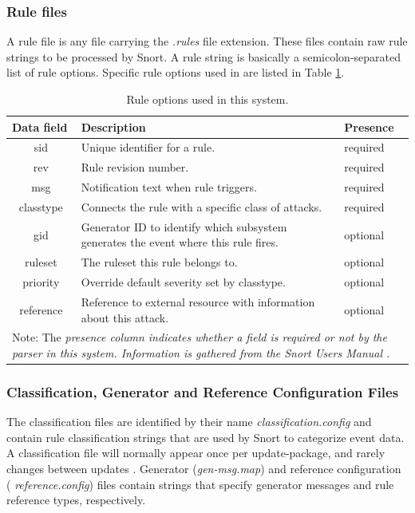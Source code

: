 \subsubsection{Rule files}
A rule file is any file carrying the {\em .rules} file extension. These
files contain raw rule strings to be processed by Snort. A rule string is
basically a semicolon-separated list of rule options. Specific rule options used
in \snowman{} are listed in Table \ref{tab:ruleFormat}.

\renewcommand{\arraystretch}{1.5}

\begin{table}[tbp]
  \centering
  \begin{tabular}{l|p{8cm}|l}
  	Data field  & Description & Presence \\
    \hline
    	\multicolumn{1}{c|}{sid} & Unique identifier for a rule. & required\\
	    \multicolumn{1}{c|}{rev} & Rule revision number. & required \\
	    \multicolumn{1}{c|}{msg} & Notification text when rule triggers. &
	    required \\
	    \multicolumn{1}{c|}{classtype} & Connects the rule with a specific class
	    of attacks. & required \\
	    \multicolumn{1}{c|}{gid} & Generator ID to identify which subsystem
	    generates the event where this rule fires. & optional \\
	    \multicolumn{1}{c|}{ruleset} & The ruleset this rule belongs to. & optional \\
	    \multicolumn{1}{c|}{priority} & Override default severity set by classtype.
	    & optional
	    \\
	    \multicolumn{1}{c|}{reference} & Reference to external resource with
	    information about this attack. & optional \\
	    \hline
		\multicolumn{3}{p{12cm}}{Note: The \em presence \em column indicates whether a
		field is required or not by the parser in this system. Information is gathered from the
		Snort Users Manual \cite{SnortManual}.
		}
  \end{tabular}
  \caption{Rule options used in this system.}
  \label{tab:ruleFormat}
\end{table}

\subsubsection{Classification, Generator and Reference Configuration Files}
The classification files are identified by their name {\em
classification.config} and contain rule classification strings that are used by
Snort to categorize event data. A classification file will normally appear once
per update-package, and rarely changes between
updates \cite{snort_conf_configurations}.
Generator ({\em gen-msg.map}) and reference configuration ({\em
reference.config}) files contain strings that specify generator messages
and rule reference types, respectively.

